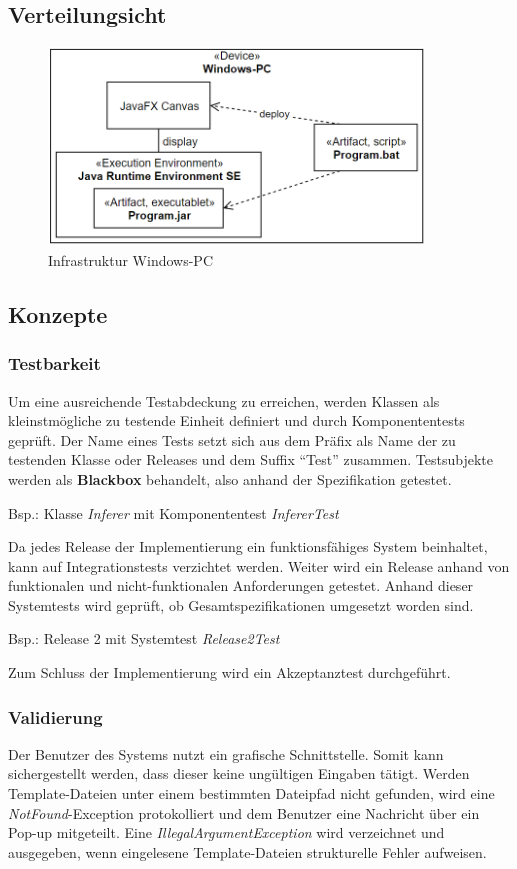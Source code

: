 \subsection{Verteilungsicht}
\begin{figure}[H]
    \centering
    \includegraphics[width=10cm]{../images/Verteilungssicht.PNG}
    \caption{Infrastruktur Windows-PC}
\end{figure}

\subsection{Konzepte}

\subsubsection{Testbarkeit}
Um eine ausreichende Testabdeckung zu erreichen, werden Klassen als kleinstmögliche zu testende Einheit definiert
und durch Komponententests geprüft.
Der Name eines Tests setzt sich aus dem Präfix als Name der zu testenden Klasse oder Releases und dem Suffix
"`Test"'
zusammen.
Testsubjekte werden als \textbf{Blackbox} behandelt, also anhand der Spezifikation getestet.
\begin{center}
    Bsp.: Klasse \textit{Inferer} mit Komponententest \textit{InfererTest}
\end{center}
Da jedes Release der Implementierung ein funktionsfähiges System beinhaltet, kann auf Integrationstests
verzichtet werden.
Weiter wird ein Release anhand von funktionalen und nicht-funktionalen Anforderungen getestet.
Anhand dieser Systemtests wird geprüft, ob Gesamtspezifikationen umgesetzt worden sind.
\begin{center}
    Bsp.: Release 2 mit Systemtest \textit{Release2Test}
\end{center}
Zum Schluss der Implementierung wird ein Akzeptanztest durchgeführt.

\subsubsection{Validierung}
Der Benutzer des Systems nutzt ein grafische Schnittstelle.
Somit kann sichergestellt werden, dass dieser keine ungültigen Eingaben tätigt.
Werden Template-Dateien unter einem bestimmten Dateipfad nicht gefunden, wird eine \textit{NotFound}-Exception
protokolliert und dem Benutzer eine Nachricht über ein Pop-up mitgeteilt.
Eine \textit{IllegalArgumentException} wird verzeichnet und ausgegeben, wenn eingelesene Template-Dateien
strukturelle Fehler aufweisen.

